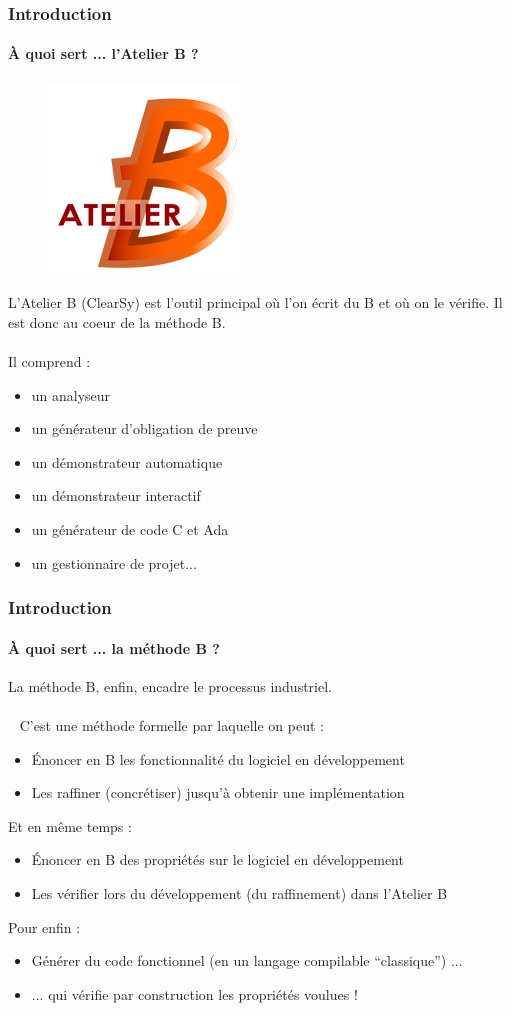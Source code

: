 \documentclass[11pt,a4paper,xcolor=table]{beamer} %
\begin{document}
\begin{frame}
\frametitle{Introduction}
\framesubtitle{À quoi sert ... l'Atelier B ?}
\begin{figure}[h]
\centering
\includegraphics[scale=0.2]{ressources/logo.png}
\end{figure}
\pause
L'Atelier B (ClearSy) est l'outil principal où l'on écrit du B et où on le vérifie. Il est donc au coeur de la méthode B.\\~\\
\pause
Il comprend :
\begin{itemize}
\item un analyseur
\pause
\item un générateur d'obligation de preuve
\pause
\item un démonstrateur automatique
\pause
\item un démonstrateur interactif
\pause
\item un générateur de code C et Ada
\pause
\item un gestionnaire de projet...
\end{itemize}
\end{frame}

\begin{frame}
\frametitle{Introduction}
\framesubtitle{À quoi sert ... la méthode B ?}
La méthode B, enfin, encadre le processus industriel.\\~\\~\pause
C'est une méthode formelle par laquelle on peut :\pause
\begin{itemize}
\item Énoncer en B les fonctionnalité du logiciel en développement
\pause
\item Les raffiner (concrétiser) jusqu'à obtenir une implémentation
\pause
\end{itemize}
Et en même temps :\pause
\begin{itemize}
\item Énoncer en B des propriétés sur le logiciel en développement
\pause
\item Les vérifier lors du développement (du raffinement) dans l'Atelier B
\pause
\end{itemize}
Pour enfin :
\begin{itemize}
\item Générer du code fonctionnel (en un langage compilable ``classique'') ...
\pause
\item ... qui vérifie par construction les propriétés voulues !
\end{itemize}
\end{frame}
\end{document}

